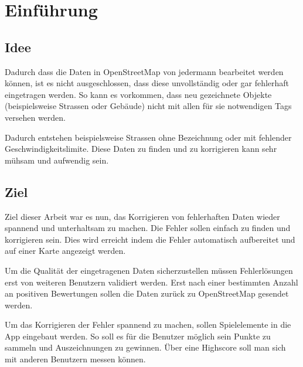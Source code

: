 \section{Einführung}

\subsection{Idee}
Dadurch dass die Daten in \gls{OpenStreetMap} von jedermann bearbeitet werden können, ist es nicht ausgeschlossen, dass diese unvollständig oder gar fehlerhaft eingetragen werden.
So kann es vorkommen, dass neu gezeichnete Objekte (beispielsweise Strassen oder Gebäude) nicht mit allen für sie notwendigen \glspl{Tag} versehen werden.

Dadurch entstehen beispielsweise Strassen ohne Bezeichnung oder mit fehlender Geschwindigkeitslimite.
Diese Daten zu finden und zu korrigieren kann sehr mühsam und aufwendig sein.

\subsection{Ziel}
Ziel dieser Arbeit war es nun, das Korrigieren von fehlerhaften Daten wieder spannend und unterhaltsam zu machen.
Die Fehler sollen einfach zu finden und korrigieren sein.
Dies wird erreicht indem die Fehler automatisch aufbereitet und auf einer Karte angezeigt werden.

Um die Qualität der eingetragenen Daten sicherzustellen müssen Fehlerlösungen erst von weiteren Benutzern validiert werden.
Erst nach einer bestimmten Anzahl an positiven Bewertungen sollen die Daten zurück zu \gls{OpenStreetMap} gesendet werden.

Um das Korrigieren der Fehler spannend zu machen, sollen Spielelemente in die App eingebaut werden.
So soll es für die Benutzer möglich sein Punkte zu sammeln und Auszeichnungen zu gewinnen. Über eine Highscore soll man sich mit anderen Benutzern messen können.